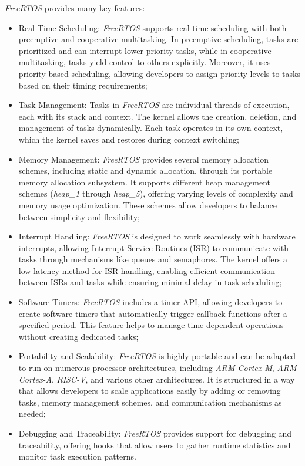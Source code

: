 \textit{FreeRTOS} provides many key features:
\begin{itemize}
  \item Real-Time Scheduling: \textit{FreeRTOS} supports real-time scheduling with
    both preemptive and cooperative multitasking. In preemptive scheduling, tasks
    are prioritized and can interrupt lower-priority tasks, while in cooperative
    multitasking, tasks yield control to others explicitly. Moreover, it uses priority-based
    scheduling, allowing developers to assign priority levels to tasks based on
    their timing requirements;

  \item Task Management: Tasks in \textit{FreeRTOS} are individual threads of execution,
    each with its stack and context. The kernel allows the creation, deletion, and
    management of tasks dynamically. Each task operates in its own context, which
    the kernel saves and restores during context switching;

  \item Memory Management: \textit{FreeRTOS} provides several memory allocation schemes,
    including static and dynamic allocation, through its portable memory allocation
    subsystem. It supports different heap management schemes (\textit{heap\_1}
    through \textit{heap\_5}), offering varying levels of complexity and memory usage
    optimization. These schemes allow developers to balance between simplicity
    and flexibility;

  \item Interrupt Handling: \textit{FreeRTOS} is designed to work seamlessly with
    hardware interrupts, allowing Interrupt Service Routines (ISR) to
    communicate with tasks through mechanisms like queues and semaphores. The kernel
    offers a low-latency method for ISR handling, enabling efficient
    communication between ISRs and tasks while ensuring minimal delay in task
    scheduling;

  \item Software Timers: \textit{FreeRTOS} includes a timer API, allowing
    developers to create software timers that automatically trigger callback
    functions after a specified period. This feature helps to manage time-dependent
    operations without creating dedicated tasks;

  \item Portability and Scalability: \textit{FreeRTOS} is highly portable and can
    be adapted to run on numerous processor architectures, including \textit{ARM
    Cortex-M}, \textit{ARM Cortex-A}, \textit{RISC-V}, and various other
    architectures. It is structured in a way that allows developers to scale applications
    easily by adding or removing tasks, memory management schemes, and communication
    mechanisms as needed;

  \item Debugging and Traceability: \textit{FreeRTOS} provides support for debugging
    and traceability, offering hooks that allow users to gather runtime
    statistics and monitor task execution patterns.
\end{itemize}

